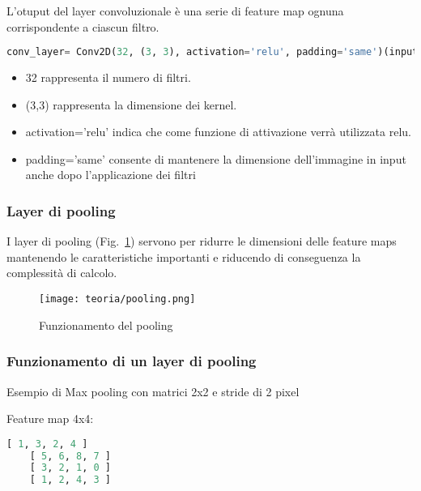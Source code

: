 L'otuput del layer convoluzionale è una serie di feature map ognuna corrispondente a ciascun filtro.

\begin{lstlisting}[language=Python, frame=none]
    conv_layer= Conv2D(32, (3, 3), activation='relu', padding='same')(input_img)
\end{lstlisting}

\begin{itemize}
    \item 32 rappresenta il numero di filtri.
    \item (3,3) rappresenta la dimensione dei kernel.
    \item activation='relu' indica che come funzione di attivazione verrà utilizzata relu.
    \item padding='same' consente di mantenere la dimensione dell'immagine in input anche dopo l'applicazione dei filtri
\end{itemize}


\subsubsection{Layer di pooling}
I layer di pooling (Fig.~\ref{fig:pooling}) servono per ridurre le dimensioni delle feature maps mantenendo le caratteristiche importanti e riducendo di conseguenza la complessità di calcolo.


\begin{figure}[!h] 
    \centering 
    \texttt{[image: teoria/pooling.png]} 
    \caption{Funzionamento del pooling}
    \label{fig:pooling}
  \end{figure}



\subsubsection{Funzionamento di un layer di pooling}
Esempio di Max pooling con matrici 2x2 e stride di 2 pixel

Feature map 4x4:
\begin{lstlisting}[language=Python, frame=none]
    [ 1, 3, 2, 4 ]
    [ 5, 6, 8, 7 ]
    [ 3, 2, 1, 0 ]
    [ 1, 2, 4, 3 ]
\end{lstlisting}

